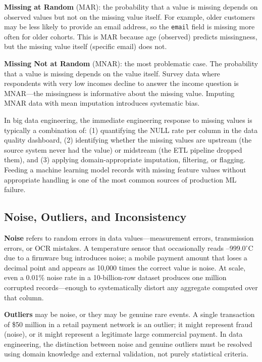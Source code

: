 \textbf{Missing at Random} (MAR): the probability that a value is
missing depends on observed values but not on the missing value itself.
For example, older customers may be less likely to provide an email
address, so the \texttt{email} field is missing more often for older
cohorts. This is MAR because age (observed) predicts missingness, but
the missing value itself (specific email) does not.

\textbf{Missing Not at Random} (MNAR): the most problematic case. The
probability that a value is missing depends on the value itself.
Survey data where respondents with very low incomes decline to answer
the income question is MNAR---the missingness is informative about
the missing value. Imputing MNAR data with mean imputation introduces
systematic bias.

In big data engineering, the immediate engineering response to missing
values is typically a combination of: (1) quantifying the NULL rate
per column in the data quality dashboard, (2) identifying whether
the missing values are upstream (the source system never had the
value) or midstream (the ETL pipeline dropped them), and (3) applying
domain-appropriate imputation, filtering, or flagging. Feeding a machine
learning model records with missing feature values without appropriate
handling is one of the most common sources of production ML failure.

\subsection{Noise, Outliers, and Inconsistency}
\label{subsec:noise-outliers}

\textbf{Noise} refers to random errors in data values---measurement
errors, transmission errors, or OCR mistakes. A temperature sensor that
occasionally reads --999.0$^{\circ}$C due to a firmware bug introduces
noise; a mobile payment amount that loses a decimal point and appears
as 10,000 times the correct value is noise. At scale, even a 0.01\%
noise rate in a 10-billion-row dataset produces one million corrupted
records---enough to systematically distort any aggregate computed over
that column.

\textbf{Outliers} may be noise, or they may be genuine rare events.
A single transaction of \$50 million in a retail payment network is
an outlier; it might represent fraud (noise), or it might represent a
legitimate large commercial payment. In data engineering, the
distinction between noise and genuine outliers must be resolved using
domain knowledge and external validation, not purely statistical
criteria.

